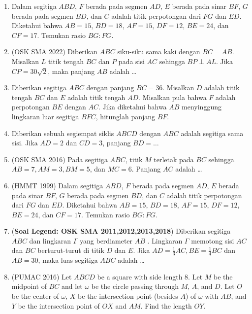 \documentclass[12pt]{scrartcl}
\begin{document}
\begin{enumerate}
        \item Dalam segitiga $ABD$, $F$ berada pada segmen $AD$, $E$ berada pada sinar $BF$, $G$ berada pada segmen $BD$, dan $C$ adalah titik perpotongan dari $FG$ dan $ED$. Diketahui bahwa $AB = 15$, $BD = 18$, $AF = 15$, $DF = 12$, $BE = 24$, dan $CF = 17$. Temukan rasio $BG : FG$.

    \item (OSK SMA 2022) Diberikan $ABC$ siku-siku sama kaki dengan $BC=AB$. Misalkan $L$ titik tengah $BC$ dan $P$ pada sisi $AC$ sehingga $BP \perp AL$. Jika $CP=30\sqrt{2}$, maka panjang $AB$ adalah \ldots

    \item Diberikan segitiga $ABC$ dengan panjang $BC = 36$. Misalkan $D$ adalah titik tengah $BC$ dan $E$ adalah titik tengah $AD$. Misalkan pula bahwa $F$ adalah perpotongan $BE$ dengan $AC$. Jika diketahui bahwa $AB$ menyinggung lingkaran luar segitiga $BFC$, hitunglah panjang $BF$.

    \item Diberikan sebuah segiempat siklis $ABCD$ dengan $ABC$ adalah segitiga sama sisi. Jika $AD=2$ dan $CD=3$, panjang $BD=\dots$

    \item (OSK SMA 2016) Pada segitiga $ABC$, titik $M$ terletak pada $BC$ sehingga $AB=7, AM=3, BM=5$, dan $MC=6$. Panjang $AC$ adalah \dots

    \item (HMMT 1999) Dalam segitiga $ABD$, $F$ berada pada segmen $AD$, $E$ berada pada sinar $BF$, $G$ berada pada segmen $BD$, dan $C$ adalah titik perpotongan dari $FG$ dan $ED$. Diketahui bahwa $AB = 15$, $BD = 18$, $AF = 15$, $DF = 12$, $BE = 24$, dan $CF = 17$. Temukan rasio $BG : FG$.

    \item (\textbf{Soal Legend: OSK SMA 2011,2012,2013,2018}) Diberikan segitiga $ABC$ dan lingkaran $\Gamma$ yang berdiameter $AB$ . Lingkaran $\Gamma$ memotong sisi $AC$ dan $BC$ berturut-turut di titik $D$ dan $E$. Jika $AD = \frac13 AC, BE =\frac14 BC$ dan $AB = 30$, maka luas segitiga $ABC$ adalah \dots
    
    \item (PUMAC 2016) Let $ABCD$ be a square with side length 8. Let $M$ be the midpoint of $BC$ and let $\omega$ be the circle passing through $M$, $A$, and $D$. Let $O$ be the center of $\omega$, $X$ be the intersection point (besides $A$) of $\omega$ with $AB$, and $Y$ be the intersection point of $OX$ and $AM$. Find the length $OY$.


\end{enumerate}
\end{document}

